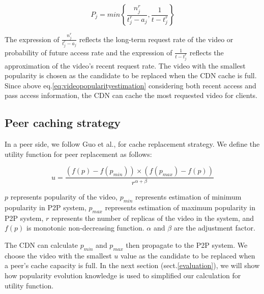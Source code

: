 \documentclass[10pt,final,journal,a4paper]{IEEEtran}
\begin{document}
\begin{equation}
P_j = min\left\{\frac{n_j^r}{t_j^r - a_j}, \frac{1}{t - t_j^r}\right\}
\label{eq:videopopularityestimation}
\end{equation}

The expression of $\frac{n_j^r}{t_j^r - a_j}$ reflects the long-term request rate of the video or probability of future access rate and the expression of $\frac{1}{t - t_j^r}$ reflects the approximation of the video's recent request rate.
The video with the smallest popularity is chosen as the candidate to be replaced when the CDN cache is full. 
Since above eq.\ref{eq:videopopularityestimation} considering both recent access and pass access information, the CDN can cache the most requested video for clients.

\subsection{Peer caching strategy}\label{peercachingstrategy}
In a peer side, we follow Guo et al., \cite{1613869} for cache replacement strategy. 
We define the utility function for peer replacement as follows:

\begin{equation}
u = \frac{ (f(p)-f(p_{min})) \times  (f(p_{max})-f(p))}{r^{\alpha + \beta}}
\label{eq:utilityfunction}
\end{equation}

$p$ represents popularity of the video, $p_{min}$ represents estimation of minimum popularity in P2P system, $p_{max}$ represents estimation of maximum popularity in P2P system, $r$ represents the number of replicas of the video in the system, and $f(p)$ is monotonic non-decreasing function.
$\alpha$ and $\beta$ are the adjustment factor.

The CDN can calculate $p_{min}$ and $p_{max}$ then propagate to the P2P system.
We choose the video with the smallest $u$ value as the candidate to be replaced when a peer's cache capacity is full.
In the next section (sect.\ref{evaluation}), we will show how popularity evolution knowledge is used to simplified our calculation for utility function.
\end{document}

